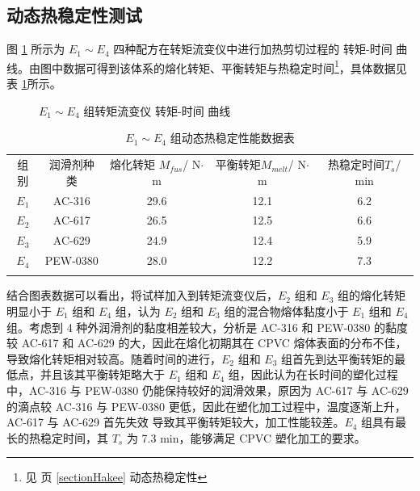 \subsection{动态热稳定性测试}

图 \ref{fig1Hakee} 所示为 $E_1 \sim E_4$ 四种配方在转矩流变仪中进行加热剪切过程的 转矩-时间 曲线。由图中数据可得到该体系的熔化转矩、平衡转矩与热稳定时间\footnote{见 \pageref{sectionHakee} 页 \ref{sectionHakee} 动态热稳定性}，具体数据见表 \ref{tab1Hakee}所示。

\begin{figure}[!htb]
    \begin{center}
        
    \end{center}
    \caption{$E_1 \sim E_4$ 组转矩流变仪 转矩-时间 曲线}
    \label{fig1Hakee}
\end{figure}

\begin{table}[!htb]
    \caption{$E_1 \sim E_4$ 组动态热稳定性能数据表}
    \label{tab1Hakee}
    \begin{center}
    \footnotesize{
        \begin{tabular}{ccccc}
            \Xhline{1pt}
            组别 & 润滑剂种类 & \makecell[c]{熔化转矩 $M_{fus}$/\\N$\cdot$m} & \makecell[c]{平衡转矩$M_{melt}$/\\N$\cdot$m} & \makecell[c]{热稳定时间$T_{s}$/\\min} \\
            \Xhline{0.5pt}
            $E_1$ & AC-316 & 29.6 & 12.1 & 6.2  \\
            $E_2$ & AC-617 & 26.5 & 12.5 & 6.6  \\
            $E_3$ & AC-629 & 24.9 & 12.4 & 5.9  \\
            $E_4$ & PEW-0380 & 28.0 & 12.2 & 7.3    \\
            \Xhline{1pt}
        \end{tabular}
    }
    \end{center}
\end{table}

结合图表数据可以看出，将试样加入到转矩流变仪后，$E_2$ 组和 $E_3$ 组的熔化转矩明显小于 $E_1$ 组和 $E_4$ 组，认为 $E_2$ 组和 $E_3$ 组的混合物熔体黏度小于 $E_1$ 组和 $E_4$ 组。考虑到 4 种外润滑剂的黏度相差较大，分析是 AC-316 和 PEW-0380 的黏度较 AC-617 和 AC-629 的大，因此在熔化初期其在 CPVC 熔体表面的分布不佳，导致熔化转矩相对较高。随着时间的进行，$E_2$ 组和 $E_3$ 组首先到达平衡转矩的最低点，并且该其平衡转矩略大于 $E_1$ 组和 $E_4$ 组，因此认为在长时间的塑化过程中，AC-316 与 PEW-0380 仍能保持较好的润滑效果，原因为 AC-617 与 AC-629 的滴点较 AC-316 与 PEW-0380 更低，因此在塑化加工过程中，温度逐渐上升，AC-617 与 AC-629 首先失效 导致其平衡转矩较大，加工性能较差。$E_4$ 组具有最长的热稳定时间，其 $T_{s}$ 为 7.3 min，能够满足 CPVC 塑化加工的要求。

